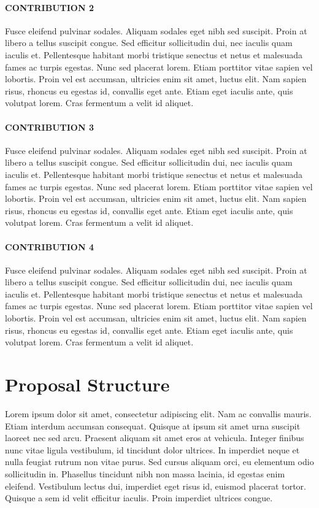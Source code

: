 \documentclass[oneside]{memoir}
\begin{document}
\paragraph{CONTRIBUTION 2} Fusce eleifend pulvinar sodales. Aliquam sodales eget nibh sed suscipit. Proin at libero a tellus suscipit congue. Sed efficitur sollicitudin dui, nec iaculis quam iaculis et. Pellentesque habitant morbi tristique senectus et netus et malesuada fames ac turpis egestas. Nunc sed placerat lorem. Etiam porttitor vitae sapien vel lobortis. Proin vel est accumsan, ultricies enim sit amet, luctus elit. Nam sapien risus, rhoncus eu egestas id, convallis eget ante. Etiam eget iaculis ante, quis volutpat lorem. Cras fermentum a velit id aliquet.

\paragraph{CONTRIBUTION 3} Fusce eleifend pulvinar sodales. Aliquam sodales eget nibh sed suscipit. Proin at libero a tellus suscipit congue. Sed efficitur sollicitudin dui, nec iaculis quam iaculis et. Pellentesque habitant morbi tristique senectus et netus et malesuada fames ac turpis egestas. Nunc sed placerat lorem. Etiam porttitor vitae sapien vel lobortis. Proin vel est accumsan, ultricies enim sit amet, luctus elit. Nam sapien risus, rhoncus eu egestas id, convallis eget ante. Etiam eget iaculis ante, quis volutpat lorem. Cras fermentum a velit id aliquet.

\paragraph{CONTRIBUTION 4} Fusce eleifend pulvinar sodales. Aliquam sodales eget nibh sed suscipit. Proin at libero a tellus suscipit congue. Sed efficitur sollicitudin dui, nec iaculis quam iaculis et. Pellentesque habitant morbi tristique senectus et netus et malesuada fames ac turpis egestas. Nunc sed placerat lorem. Etiam porttitor vitae sapien vel lobortis. Proin vel est accumsan, ultricies enim sit amet, luctus elit. Nam sapien risus, rhoncus eu egestas id, convallis eget ante. Etiam eget iaculis ante, quis volutpat lorem. Cras fermentum a velit id aliquet.

\section*{Proposal Structure}

Lorem ipsum dolor sit amet, consectetur adipiscing elit. Nam ac convallis mauris. Etiam interdum accumsan consequat. Quisque at ipsum sit amet urna suscipit laoreet nec sed arcu. Praesent aliquam sit amet eros at vehicula. Integer finibus nunc vitae ligula vestibulum, id tincidunt dolor ultrices. In imperdiet neque et nulla feugiat rutrum non vitae purus. Sed cursus aliquam orci, eu elementum odio sollicitudin in. Phasellus tincidunt nibh non massa lacinia, id egestas enim eleifend. Vestibulum lectus dui, imperdiet eget risus id, euismod placerat tortor. Quisque a sem id velit efficitur iaculis. Proin imperdiet ultrices congue.
\end{document}
